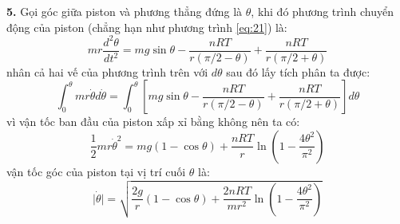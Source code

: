 \noindent\textbf{5. } Gọi góc giữa piston và phương thẳng đứng là $\theta$, khi đó phương trình chuyển động của piston (chẳng hạn như phương trình \eqref{eq:21}) là:
\begin{equation*}
  mr\frac{d^{2}\theta}{dt^{2}}=mg\sin\theta-\frac{nRT}{r(\pi/2-\theta)}+\frac{nRT}{r(\pi/2+\theta)}
\end{equation*}
nhân cả hai vế của phương trình trên với $d\theta$ sau đó lấy tích phân ta được:
\begin{equation}
  \label{eq:222}
  \int_{0}^{\theta}mr\dot{\theta}d\dot{\theta}=\int_{0}^{\theta}\left[mg\sin\theta-\frac{nRT}{r(\pi/2-\theta)}+\frac{nRT}{r(\pi/2+\theta)}\right]d\theta
\end{equation}
vì vận tốc ban đầu của piston xấp xỉ bằng không nên ta có:
\begin{equation}
  \label{eq:223}
  \frac{1}{2}mr\dot{\theta}^{2}=mg(1-\cos\theta)+\frac{nRT}{r}\ln\left(1-\frac{4\theta^{2}}{\pi^{2}}\right)
\end{equation}
vận tốc góc của piston tại vị trí cuối $\theta$ là:
\begin{equation}
  \label{eq:224}
  \lvert\dot{\theta}\rvert=\sqrt{\frac{2g}{r}(1-\cos\theta)+\frac{2nRT}{mr^{2}}\ln\left(1-\frac{4\theta^{2}}{\pi^{2}}\right)}
\end{equation}
